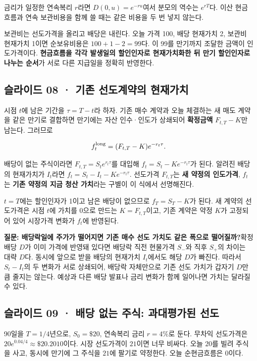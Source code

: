 \documentclass[11pt,a4paper]{article}
\begin{document}
금리가 일정한 연속복리 $r$라면 $D(0,u)=e^{-ru}$여서 분모의 역수는 $e^{rT}$다. 이산 현금흐름과 연속 보관비용을 함께 쓸 때는 같은 비용을 두 번 넣지 않는다.\par

보관비는 선도가격을 올리고 배당은 내린다. 오늘 가격 100, 배당 현재가치 2, 보관비 현재가치 1이면 순보유비용은 $100+1-2=99$다. 이 99를 만기까지 조달한 금액이 인도가격이다. \textbf{현금흐름을 각각 발생일의 할인인자로 현재가치화한 뒤 만기 할인인자로 나누는 순서}가 서로 다른 지급일을 정확히 반영한다.\par

\subsection{슬라이드 08 · 기존 선도계약의 현재가치}
시점 $t$에 남은 기간을 $\tau=T-t$라 하자. 기존 매수 계약과 오늘 체결하는 새 매도 계약을 같은 만기로 결합하면 만기에는 자산 인수·인도가 상쇄되어 \textbf{확정금액} $F_{t,T}-K$만 남는다. 그러므로\par

\[
f_t^{\rm long}=(F_{t,T}-K)e^{-r_t\tau}.
\]

배당이 없는 주식이라면 $F_{t,T}=S_te^{r_t\tau}$를 대입해 $f_t=S_t-Ke^{-r_t\tau}$가 된다. 알려진 배당의 현재가치가 $I_t$라면 $f_t=S_t-I_t-Ke^{-r_t\tau}$. 선도가격 $F_{t,T}$는 \textbf{새 약정의 인도가격}, $f_t$는 \textbf{기존 약정의 지금 청산 가치}라는 구별이 이 식에서 선명해진다.\par

$t=T$에는 할인인자가 1이고 남은 배당이 없으므로 $f_T=S_T-K$가 된다. 새 계약의 선도가격은 시점 $t$에 가치를 0으로 만드는 $K=F_{t,T}$이고, 기존 계약은 약정 $K$가 고정되어 있어 시장가격 변화가 $f_t$에 반영된다.\par

\par\medskip\noindent\textbf{질문: 배당락일에 주가가 떨어지면 기존 매수 선도 가치도 같은 폭으로 떨어질까?}\quad 확정 배당 $D$가 이미 가격에 반영돼 있다면 배당락 직전 현물가격 $S_-$와 직후 $S_+$의 차이는 대략 $D$다. 동시에 앞으로 받을 배당의 현재가치 $I_t$에서도 해당 $D$가 빠진다. 따라서 $S_t-I_t$의 두 변화가 서로 상쇄되어, 배당락 자체만으로 기존 선도 가치가 갑자기 $D$만큼 줄지는 않는다. 예상과 다른 배당 발표나 금리 변화가 함께 일어나면 가치는 달라질 수 있다.\par

\subsection{슬라이드 09 · 배당 없는 주식: 과대평가된 선도}
90일을 $T=1/4$년으로, $S_0=\$20$, 연속복리 금리 $r=4\%$로 둔다. 무차익 선도가격은 $20e^{0.04/4}\approx\$20.2010$이다. 시장 선도가격이 $21$이면 너무 비싸다. 오늘 $20$를 빌려 주식을 사고, 동시에 만기에 그 주식을 $21$에 팔기로 약정한다. 오늘 순현금흐름은 0이다.\par
\end{document}
